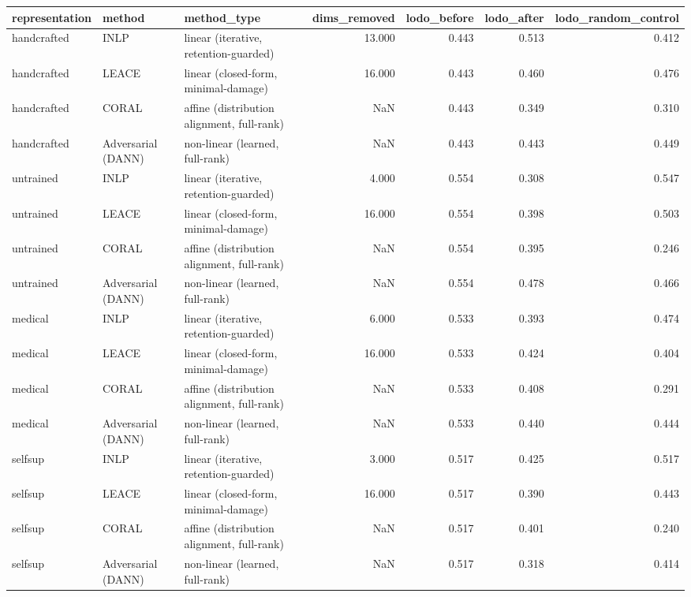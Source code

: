 \begin{tabular}{lllrrrr}
\toprule
representation & method & method\_type & dims\_removed & lodo\_before & lodo\_after & lodo\_random\_control \\
\midrule
handcrafted & INLP & linear (iterative, retention-guarded) & 13.000 & 0.443 & 0.513 & 0.412 \\
handcrafted & LEACE & linear (closed-form, minimal-damage) & 16.000 & 0.443 & 0.460 & 0.476 \\
handcrafted & CORAL & affine (distribution alignment, full-rank) & NaN & 0.443 & 0.349 & 0.310 \\
handcrafted & Adversarial (DANN) & non-linear (learned, full-rank) & NaN & 0.443 & 0.443 & 0.449 \\
untrained & INLP & linear (iterative, retention-guarded) & 4.000 & 0.554 & 0.308 & 0.547 \\
untrained & LEACE & linear (closed-form, minimal-damage) & 16.000 & 0.554 & 0.398 & 0.503 \\
untrained & CORAL & affine (distribution alignment, full-rank) & NaN & 0.554 & 0.395 & 0.246 \\
untrained & Adversarial (DANN) & non-linear (learned, full-rank) & NaN & 0.554 & 0.478 & 0.466 \\
medical & INLP & linear (iterative, retention-guarded) & 6.000 & 0.533 & 0.393 & 0.474 \\
medical & LEACE & linear (closed-form, minimal-damage) & 16.000 & 0.533 & 0.424 & 0.404 \\
medical & CORAL & affine (distribution alignment, full-rank) & NaN & 0.533 & 0.408 & 0.291 \\
medical & Adversarial (DANN) & non-linear (learned, full-rank) & NaN & 0.533 & 0.440 & 0.444 \\
selfsup & INLP & linear (iterative, retention-guarded) & 3.000 & 0.517 & 0.425 & 0.517 \\
selfsup & LEACE & linear (closed-form, minimal-damage) & 16.000 & 0.517 & 0.390 & 0.443 \\
selfsup & CORAL & affine (distribution alignment, full-rank) & NaN & 0.517 & 0.401 & 0.240 \\
selfsup & Adversarial (DANN) & non-linear (learned, full-rank) & NaN & 0.517 & 0.318 & 0.414 \\
\bottomrule
\end{tabular}
